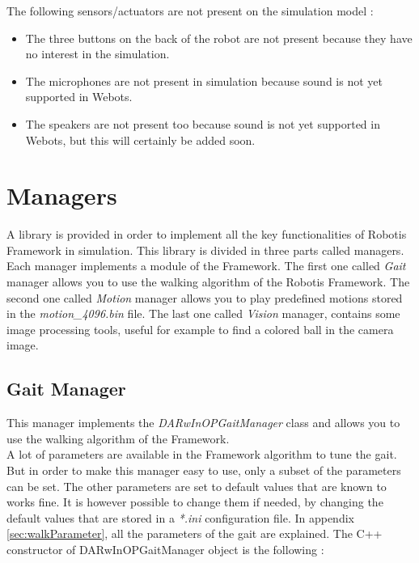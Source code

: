 \documentclass[a4paper, 12pt]{article}  		%
\begin{document}
The following sensors/actuators are not present on the simulation model :
\begin{itemize}
\item The three buttons on the back of the robot are not present because they have no interest in the simulation.
\item The microphones are not present in simulation because sound is not yet supported in Webots.
\item The speakers are not present too because sound is not yet supported in Webots, but this will certainly be added soon. 
\end{itemize}


\newpage
\section{Managers}

A library is provided in order to implement all the key functionalities of Robotis Framework in simulation. This library is divided in three parts called managers. Each manager implements a module of the Framework. The first one called \textit{Gait} manager allows you to use the walking algorithm of the Robotis Framework. The second one called \textit{Motion} manager allows you to play predefined motions stored in the \textit{motion\_4096.bin} file. The last one called \textit{Vision} manager, contains some image processing tools, useful for example to find a colored ball in the camera image.\\

\subsection{Gait Manager}
This manager implements the \textit{DARwInOPGaitManager} class and allows you to use the walking algorithm of the Framework.\\

A lot of parameters are available in the Framework algorithm to tune the gait. But in order to make this manager easy to use, only a subset of the parameters can be set. The other parameters are set to default values that are known to works fine. It is however possible to change them if needed, by changing the default values that are stored in a \textit{*.ini} configuration file. In appendix \ref{sec:walkParameter}, all the parameters of the gait are explained. The C++ constructor of DARwInOPGaitManager object is the following :\\
\end{document}
